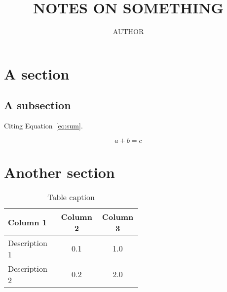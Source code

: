 \documentclass[a4paper, twocolumn, 12pt]{article}
\begin{document}
\title{NOTES ON SOMETHING}
\author{AUTHOR}
\maketitle{}

\section{A section}
\blindtext[1]{}

\subsection{A subsection}
\blindtext[1]{}

Citing Equation~\ref{eq:sum}.

\begin{equation}
\label{eq:sum}
    a + b = c
\end{equation}

\section{Another section}
\blindtext[1]{}

\begin{table}[hbt!]
  \centering
  \renewcommand{\arraystretch}{1.1}
  \caption{Table caption}
  \begin{tabular}{p{0.3\linewidth}c{0.12\linewidth}c{0.12\linewidth}}
   \toprule
   \textbf{Column 1} & \textbf{Column 2} & \textbf{Column 3} \\
   \midrule
   Description 1 & 0.1 & 1.0 \\
   Description 2 & 0.2 & 2.0 \\
  \bottomrule
  \end{tabular}\label{tab:table}
  \renewcommand{\arraystretch}{1}
\end{table}
\end{document}

